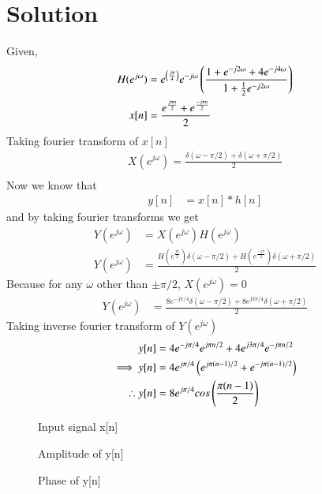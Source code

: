 \documentclass[journal,12pt,twocolumn]{IEEEtran}
\begin{document}
\section{Solution}
Given,
\begin{align}
    H(e^{j\omega}) &= e^{\left(\frac{j\pi}{4}\right)}e^{-j\omega}\left(\frac{1+e^{-j2\omega}+4e^{-j4\omega}}{1+\frac{1}{2}e^{-j2\omega}}\right)\\
    x[n] &= \frac{e^{\frac{j\pi n}{2}}+e^{\frac{-j\pi n}{2}}}{2}
\end{align}
Taking fourier transform of $x[n]$
\begin{align}
    X(e^{j\omega}) = \frac{\delta(\omega-\pi/2)+\delta(\omega+\pi/2)}{2}\\
\end{align}
Now we know that
\begin{align}
    y[n] &= x[n]*h[n]
\end{align}
and by taking fourier transforms we get
\begin{align}
    Y(e^{j\omega}) &= X(e^{j\omega})H(e^{j\omega})\\
    Y(e^{j\omega}) &= \frac{H(e^{\frac{j\pi}{2}})\delta(\omega-\pi/2)+H(e^{\frac{-j\pi}{2}})\delta(\omega+\pi/2)}{2}
\end{align}
Because for any $\omega$ other than $\pm \pi/2$, $X(e^{j\omega})=0$
\begin{align}
    Y(e^{j\omega}) &= \frac{8e^{-j\pi/4}\delta(\omega-\pi/2)+8e^{j3\pi/4}\delta(\omega+\pi/2)}{2}
\end{align}
Taking inverse fourier transform of $Y(e^{j\omega})$
\begin{align}
    y[n] &= 4e^{-j\pi/4}e^{j\pi n/2}+4e^{j3\pi/4}e^{-j\pi n/2}\\
    \implies y[n] &= 4e^{j\pi/4}\left(e^{j\pi(n-1)/2}+e^{-j\pi(n-1)/2}\right)\\
    \therefore y[n] &= 8e^{j\pi/4}cos\left(\frac{\pi(n-1)}{2}\right)
\end{align}
\begin{figure}[!ht]
    \centering
    \caption{Input signal x[n]}
    \label{Input Signal x[n]}
\end{figure}
\begin{figure}[!ht]
    \centering
    \caption{Amplitude of y[n]}
\end{figure}
\begin{figure}[!ht]
    \centering
    \caption{Phase of y[n]}
\end{figure}
\end{document}

